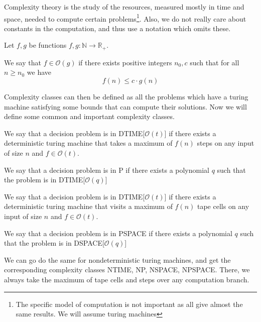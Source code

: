 Complexity theory is the study of the resources, measured mostly in time and space, needed to compute certain problems\footnote{The specific model of computation is not important as all give almost the same results. We will assume turing machines}.
Also, we do not really care about constants in the computation, and thus use a notation which omits these.

\begin{define}
    Let $f, g$ be functions $f, g: \mathbb{N} \to \mathbb{R}_+$.

    We say that $f \in \mathcal{O}(g)$ if there exists positive integers $n_0, c$ such that for all $n \geq n_0$ we have \[f(n) \leq c\cdot g(n)\]
\end{define}

Complexity classes can then be defined as all the problems which have a turing machine satisfying some bounds that can compute their solutions.
Now we will define some common and important complexity classes.

\begin{define}
[{DTIME[$\mathcal{O}(t)$]}]
    We say that a decision problem is in DTIME[$\mathcal{O}(t)$] if there exists a deterministic turing machine that takes a maximum of $f(n)$ steps on any input of size $n$ and $f \in \mathcal{O}(t)$.
\end{define}

\begin{define}[P]
    We say that a decision problem is in P if there exists a polynomial $q$ such that the problem is in DTIME[$\mathcal{O}(q)$]
\end{define}

\begin{define}
[{DSPACE[$\mathcal{O}(t)$]}]
    We say that a decision problem is in DTIME[$\mathcal{O}(t)$] if there exists a deterministic turing machine that visits a maximum of $f(n)$ tape cells on any input of size $n$ and $f \in \mathcal{O}(t)$.
\end{define}

\begin{define}[PSPACE]
    We say that a decision problem is in PSPACE if there exists a polynomial $q$ such that the problem is in DSPACE[$\mathcal{O}(q)$]
\end{define}

We can go do the same for nondeterministic turing machines, and get the corresponding complexity classes NTIME, NP, NSPACE, NPSPACE\@.
There, we always take the maximum of tape cells and steps over any computation branch.

